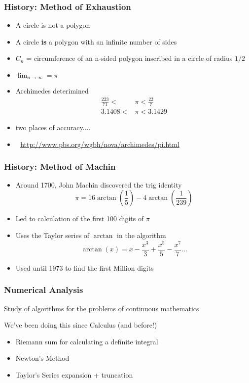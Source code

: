 \documentclass[10pt]{beamer}
\begin{document}
\begin{frame}
\frametitle{History: Method of Exhaustion}
\begin{itemize}
  \item A circle is not a polygon
  \item A circle {\bf is} a polygon with an infinite number of sides
  \item $C_n$ = circumference of an n-sided polygon inscribed in a circle of
  radius $1/2$
  \item $\lim_{n\rightarrow\infty} = \pi$
  \item Archimedes deterimined
    \begin{align*}
    \frac{223}{71} < & \pi < \frac{22}{7}\\
    3.1408 < & \pi < 3.1429
    \end{align*}
  \item two places of accuracy....
  \item \,\, \url{http://www.pbs.org/wgbh/nova/archimedes/pi.html}
\end{itemize}
\end{frame}
\begin{frame}
\frametitle{History: Method of Machin}
\begin{itemize}
  \item Around 1700, John Machin discovered the trig identity
  \begin{equation*}
  \pi  = 16 \arctan{(\frac{1}{5})} - 4\arctan{(\frac{1}{239})}
  \end{equation*}
  \item Led to calculation of the first 100 digits of $\pi$
  \item Uses the Taylor series of $\arctan$ in the algorithm
  \begin{equation*}
    \arctan{(x)} = x - \frac{x^3}{3} + \frac{x^5}{5} - \frac{x^7}{7}\dots
  \end{equation*}
  \item Used until 1973 to find the first Million digits
\end{itemize}
\end{frame}
\begin{frame}
\frametitle{Numerical Analysis}
\begin{definition}[Trefethen]
Study of algorithms for the problems of continuous mathematics
\end{definition}

We've been doing this since Calculus (and before!)
\begin{itemize}
  \item Riemann sum for calculating a definite integral
  \item Newton's Method
  \item Taylor's Series expansion + truncation
\end{itemize}
\end{frame}
\end{document}

